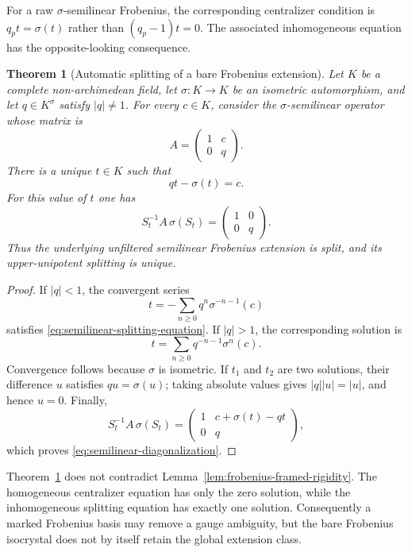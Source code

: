 \documentclass[11pt]{article}
\newtheorem{theorem}{Theorem}[section]
\theoremstyle{definition}
\theoremstyle{remark}
\begin{document}
For a raw $\sigma$-semilinear Frobenius, the corresponding centralizer
condition is $q_pt=\sigma(t)$ rather than $(q_p-1)t=0$.  The associated
inhomogeneous equation has the opposite-looking consequence.

\begin{theorem}[Automatic splitting of a bare Frobenius extension]
\label{thm:semilinear-frobenius-splitting}
Let $K$ be a complete non-archimedean field, let
$\sigma\colon K\to K$ be an isometric automorphism, and let
$q\in K^\sigma$ satisfy $|q|\ne1$.  For every $c\in K$, consider the
$\sigma$-semilinear operator whose matrix is
\[
 A=\begin{pmatrix}1&c\\0&q\end{pmatrix}.
\]
There is a unique $t\in K$ such that
\begin{equation}\label{eq:semilinear-splitting-equation}
 qt-\sigma(t)=c.
\end{equation}
For this value of $t$ one has
\begin{equation}\label{eq:semilinear-diagonalization}
 S_t^{-1}A\,\sigma(S_t)
 =\begin{pmatrix}1&0\\0&q\end{pmatrix}.
\end{equation}
Thus the underlying unfiltered semilinear Frobenius extension is split, and
its upper-unipotent splitting is unique.
\end{theorem}

\begin{proof}
If $|q|<1$, the convergent series
\[
 t=-\sum_{n\ge0}q^n\sigma^{-n-1}(c)
\]
satisfies \eqref{eq:semilinear-splitting-equation}.  If $|q|>1$, the
corresponding solution is
\[
 t=\sum_{n\ge0}q^{-n-1}\sigma^n(c).
\]
Convergence follows because $\sigma$ is isometric.  If $t_1$ and $t_2$ are
two solutions, their difference $u$ satisfies $qu=\sigma(u)$; taking
absolute values gives $|q||u|=|u|$, and hence $u=0$.  Finally,
\[
 S_t^{-1}A\,\sigma(S_t)
 =\begin{pmatrix}1&c+\sigma(t)-qt\\0&q\end{pmatrix},
\]
which proves \eqref{eq:semilinear-diagonalization}.
\end{proof}

Theorem~\ref{thm:semilinear-frobenius-splitting} does not contradict
Lemma~\ref{lem:frobenius-framed-rigidity}.  The homogeneous centralizer
equation has only the zero solution, while the inhomogeneous splitting
equation has exactly one solution.  Consequently a marked Frobenius basis
may remove a gauge ambiguity, but the bare Frobenius isocrystal does not by
itself retain the global extension class.
\end{document}
